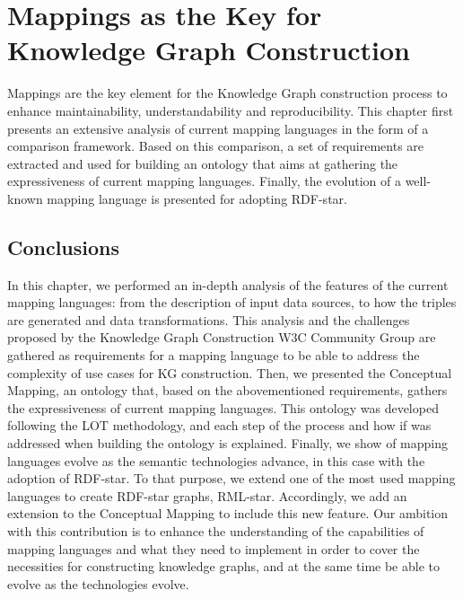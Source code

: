 
\chapter{Mappings as the Key for Knowledge Graph Construction}
\label{chapter:mappings}

Mappings are the key element for the Knowledge Graph construction process to enhance maintainability, understandability and reproducibility. This chapter first presents an extensive analysis of current mapping languages in the form of a comparison framework. Based on this comparison, a set of requirements are extracted and used for building an ontology that aims at gathering the expressiveness of current mapping languages. Finally, the evolution of a well-known mapping language is presented for adopting RDF-star.








\section{Conclusions}

In this chapter, we performed an in-depth analysis of the features of the current mapping languages: from the description of input data sources, to how the triples are generated and data transformations. This analysis and the challenges proposed by the Knowledge Graph Construction W3C Community Group are gathered as requirements for a mapping language to be able to address the complexity of use cases for KG construction. Then, we presented the Conceptual Mapping, an ontology that, based on the abovementioned requirements, gathers the expressiveness of current mapping languages. This ontology was developed following the LOT methodology, and each step of the process and how if was addressed when building the ontology is explained. Finally, we show of mapping languages evolve as the semantic technologies advance, in this case with the adoption of RDF-star. To that purpose, we extend one of the most used mapping languages to create RDF-star graphs, RML-star. Accordingly, we add an extension to the Conceptual Mapping to include this new feature. Our ambition with this contribution is to enhance the understanding of the capabilities of mapping languages and what they need to implement in order to cover the necessities for constructing knowledge graphs, and at the same time be able to evolve as the technologies evolve.